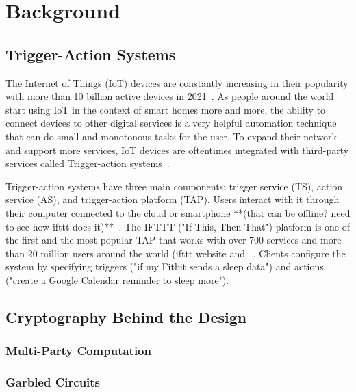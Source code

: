 \section{Background}
\label{sec:background}

\subsection{Trigger-Action Systems}

The Internet of Things (IoT) devices are constantly increasing in their popularity with more than 10 billion
active devices in 2021~\cite{DBLP:webpage/Bojan/IoTstats}. As people around the world start using IoT
in the context of smart homes more and more, the ability to connect devices to other digital services is a
very helpful automation technique that can do small and monotonous tasks for the user. To expand their
network and support more services, IoT devices are oftentimes integrated with third-party services called
Trigger-action systems~\cite{DBLP:journals/access/XuZZCDG19, DBLP:conf/chi/UrHBLMPSL16}.

Trigger-action systems have three main components: trigger service (TS), action service (AS), and
trigger-action platform (TAP). Users interact with it through their computer connected to the cloud or
smartphone **(that can be offline? need to see how ifttt does it)**~\cite{DBLP:conf/sp/ChenCWSCF21}.
The IFTTT ("If This, Then That") platform is one of the first and the most popular TAP that works with
over 700 services and more than 20 million users around the world (ifttt website and ~\cite{DBLP:conf/spChenCWSCF21}. Clients configure the system by specifying triggers ("if my Fitbit sends a sleep data")
and actions ("create a Google Calendar reminder to sleep more"). 

\subsection{Cryptography Behind the Design}

\subsubsection{Multi-Party Computation}

\subsubsection{Garbled Circuits}

